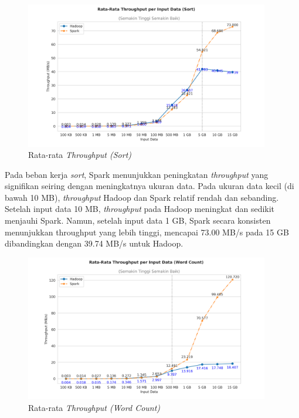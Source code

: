 \begin{figure}[h]
    \centering
    \includegraphics[width=0.95\textwidth]{figures/ch04/2-mean-throughput-sort.png}
    \caption{Rata-rata \textit{Throughput (Sort)}}
    \label{fig:mean-throughput-sort}
\end{figure}

Pada beban kerja \textit{sort}, Spark menunjukkan peningkatan \textit{throughput} yang signifikan seiring dengan meningkatnya ukuran data. Pada ukuran data kecil (di bawah 10 MB), \textit{throughput} Hadoop dan Spark relatif rendah dan sebanding. Setelah input data 10 MB, \textit{throughput} pada Hadoop meningkat dan sedikit menjauhi Spark. Namun, setelah input data 1 GB, Spark secara konsisten menunjukkan throughput yang lebih tinggi, mencapai 73.00 MB/s pada 15 GB dibandingkan dengan 39.74 MB/s untuk Hadoop.

\begin{figure}[h]
    \centering
    \includegraphics[width=0.95\textwidth]{figures/ch04/2-mean-throughput-wordcount.png}
    \caption{Rata-rata \textit{Throughput (Word Count)}}
    \label{fig:mean-throughput-wordcount}
\end{figure}

